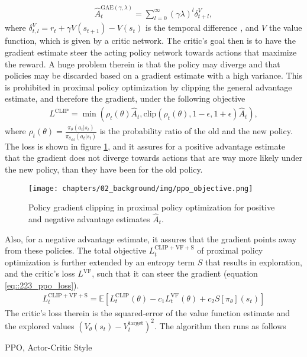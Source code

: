 \begin{align}
	\hat{A}^{\text{GAE}(\gamma,\lambda)}_t = \sum_{l=0}^\infty(\gamma\lambda)^l\delta_{t+l}^V,
	\label{eq::223_gae}
\end{align}
where $\delta^V_{t,l} = r_t + \gamma V(s_{t+1}) - V(s_t)$ is the temporal difference \cite{sutton1998introduction}, and $V$ the value function, which is given by a critic network. The critic's goal then is to have the gradient estimate steer the acting policy network towards actions that maximize the reward. A huge problem therein is that the policy may diverge and that policies may be discarded based on a gradient estimate with a high variance. This is prohibited in proximal policy optimization by clipping the general advantage estimate, and therefore the gradient, under the following objective
\begin{align}
	L^\text{CLIP} = \min(\rho_t(\theta)\hat{A}_t, \text{clip}(\rho_t(\theta), 1-\epsilon, 1+\epsilon)\hat{A}_t),
	\label{eq::223_clip}
\end{align}
where $\rho_t(\theta) = \frac{\pi_\theta(a_t|s_t)}{\pi_{\theta_\text{old}}(a_t|s_t)}$ is the probability ratio of the old and the new policy. The loss is shown in figure \ref{fig::223_ppo}, and it assures for a positive advantage estimate that the gradient does not diverge towards actions that are way more likely under the new policy, than they have been for the old policy.
\begin{figure}[h!]
	\centering
	\texttt{[image: chapters/02\_background/img/ppo\_objective.png]}
	\caption{Policy gradient clipping in proximal policy optimization for positive and negative advantage estimates $\hat{A}_t$.}
	\label{fig::223_ppo}
\end{figure}
Also, for a negative advantage estimate, it assures that the gradient points away from these policies. The total objective $L_t^{\text{CLIP}+\text{VF}+\text{S}}$ of proximal policy optimization is further extended by an entropy term $S$ that results in exploration, and the critic's loss $L^\text{VF}$, such that it can steer the gradient (equation \ref{eq::223_ppo_loss}).
\begin{align}
	L_t^{\text{CLIP}+\text{VF}+\text{S}} = \mathbb{E}\left[L_t^\text{CLIP}(\theta)-c_1L_t^\text{VF}(\theta)+c_2S\left[\pi_\theta\right](s_t)\right]
	\label{eq::223_ppo_loss}
\end{align}
The critic's loss therein is the squared-error of the value function estimate and the explored values $(V_\theta(s_t)-V^\text{target}_t)^2$. The algorithm then runs as follows
\begin{algorithm}
	\SetAlgoLined
	\caption{PPO, Actor-Critic Style}
	\label{alg::225_ac}
\end{algorithm}